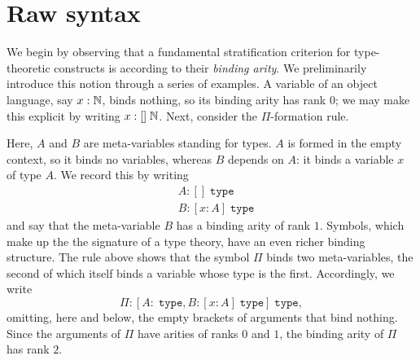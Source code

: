 \chapter{Raw syntax}
\label{ch:raw-syntax}

We begin by observing that a fundamental stratification criterion for type-theoretic constructs is according to their \textit{binding arity}. We preliminarily introduce this notion through a series of examples. A variable of an object language, say $x : \mathbb{N}$, binds nothing, so its binding arity has rank $0$; we may make this explicit by writing $x : [] \; \mathbb{N}$. 
Next, consider the $\Pi$-formation rule.
\begin{mathpar}
\end{mathpar}  
Here, $A$ and $B$ are meta-variables standing for types. $A$ is formed in the empty context, so it binds no variables, whereas $B$ depends on $A$: it binds a variable $x$ of type $A$. We record this by writing
\begin{align*}
    &A : [] \; \texttt{type}\\
    &B : [x : A] \; \texttt{type}
\end{align*}
and say that the meta-variable $B$ has a binding arity of rank $1$. Symbols, which make up the the signature of a type theory, have an even richer binding structure. The rule above shows that the symbol $\Pi$ binds two meta-variables, the second of which itself binds a variable whose type is the first. Accordingly, we write
$$\Pi : [A : \;\texttt{type}, B : [x : A] \; \texttt{type}] \; \texttt{type},$$
omitting, here and below, the empty brackets of arguments that bind nothing. Since the arguments of $\Pi$ have arities of ranks $0$ and $1$, the binding arity of $\Pi$ has rank $2$.

